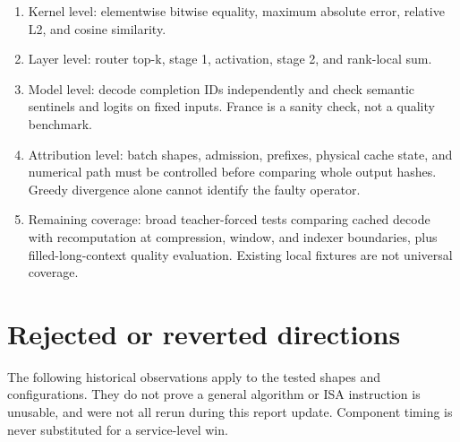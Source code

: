 \documentclass[sigplan,10pt]{acmart}
\begin{document}
\begin{enumerate}
  \item Kernel level: elementwise bitwise equality, maximum absolute error, relative L2, and cosine similarity.
  \item Layer level: router top-k, stage 1, activation, stage 2, and rank-local sum.
  \item Model level: decode completion IDs independently and check semantic sentinels and logits on fixed inputs. France is a sanity check, not a quality benchmark.
  \item Attribution level: batch shapes, admission, prefixes, physical cache state, and numerical path must be controlled before comparing whole output hashes. Greedy divergence alone cannot identify the faulty operator.
  \item Remaining coverage: broad teacher-forced tests comparing cached decode
  with recomputation at compression, window, and indexer boundaries, plus
  filled-long-context quality evaluation. Existing local fixtures are not
  universal coverage.
\end{enumerate}

\section{Rejected or reverted directions}

The following historical observations apply to the tested shapes and configurations. They do not prove a general algorithm or ISA instruction is unusable, and were not all rerun during this report update. Component timing is never substituted for a service-level win.
\end{document}
